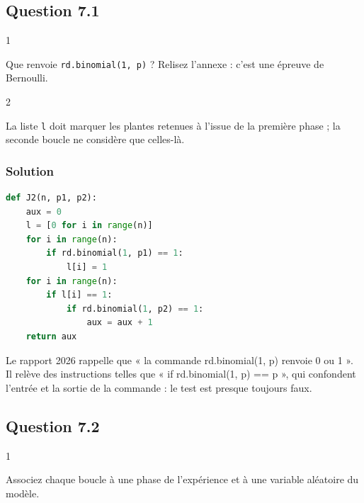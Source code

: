 \documentclass[11pt,a4paper]{article}
\begin{document}
\hypertarget{question-7.1}{%
\subsection{Question 7.1}\label{question-7.1}}

\begin{indication}{1}

Que renvoie \texttt{rd.binomial(\allowbreak{}1,\allowbreak{}\ p)\allowbreak{}} ? Relisez l'annexe : c'est une épreuve de Bernoulli.

\end{indication}

\begin{indication}{2}

La liste \texttt{l} doit marquer les plantes retenues à l'issue de la première phase ; la seconde boucle ne considère que celles-là.

\end{indication}

\hypertarget{solution-12}{%
\subsubsection{Solution}\label{solution-12}}

\begin{lstlisting}[language=Python]
def J2(n, p1, p2):
    aux = 0
    l = [0 for i in range(n)]
    for i in range(n):
        if rd.binomial(1, p1) == 1:
            l[i] = 1
    for i in range(n):
        if l[i] == 1:
            if rd.binomial(1, p2) == 1:
                aux = aux + 1
    return aux
\end{lstlisting}

\begin{piege}

Le rapport 2026 rappelle que « la commande rd.binomial(1, p) renvoie 0 ou 1 ». Il relève des instructions telles que « if rd.binomial(1, p) == p », qui confondent l'entrée et la sortie de la commande : le test est presque toujours faux.

\end{piege}

\hypertarget{question-7.2}{%
\subsection{Question 7.2}\label{question-7.2}}

\begin{indication}{1}

Associez chaque boucle à une phase de l'expérience et à une variable aléatoire du modèle.

\end{indication}
\end{document}
